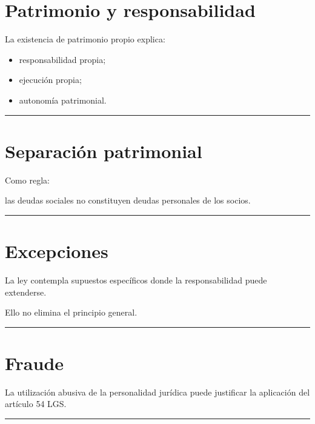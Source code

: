 \documentclass[
  spanish,
  letterpaper,
  DIV=11,
  numbers=noendperiod]{scrartcl}
\providecommand{\tightlist}{%
  \setlength{\itemsep}{0pt}\setlength{\parskip}{0pt}}
\begin{document}
\section{Patrimonio y
responsabilidad}\label{patrimonio-y-responsabilidad}

La existencia de patrimonio propio explica:

\begin{itemize}
\tightlist
\item
  responsabilidad propia;
\item
  ejecución propia;
\item
  autonomía patrimonial.
\end{itemize}

\begin{center}\rule{0.5\linewidth}{0.5pt}\end{center}

\section{Separación patrimonial}\label{separaciuxf3n-patrimonial}

Como regla:

las deudas sociales no constituyen deudas personales de los socios.

\begin{center}\rule{0.5\linewidth}{0.5pt}\end{center}

\section{Excepciones}\label{excepciones}

La ley contempla supuestos específicos donde la responsabilidad puede
extenderse.

Ello no elimina el principio general.

\begin{center}\rule{0.5\linewidth}{0.5pt}\end{center}

\section{Fraude}\label{fraude}

La utilización abusiva de la personalidad jurídica puede justificar la
aplicación del artículo 54 LGS.

\begin{center}\rule{0.5\linewidth}{0.5pt}\end{center}
\end{document}
